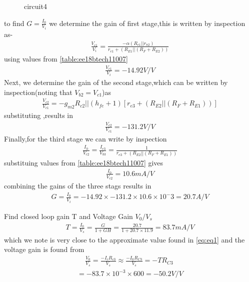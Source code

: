 \begin{enumerate}[label=\thesubsection.\arabic*.,ref=\thesubsection.\theenumi]
{\begin{figure}[!ht]
\begin{center}
		\resizebox{\columnwidth}{!}{}
	\end{center}
\caption{circuit4}
\label{fig:circuit4}
\end{figure}
to find $G=\frac{I_0}{V_i}$ we determine the gain of first stage,this is written by inspection as-
\begin{align}
    \frac{V_{c1}}{V_i}=\frac{-\alpha(R_{c1}||r_{\pi2})}{r_{e1}+(R_{E1}||(R_F+R_{E2}))}
\end{align}
using values from \ref{table:ee18btech11007}
\begin{align}
\frac{V_{c1}}{V_i}=-14.92V/V     
\end{align}
Next, we determine the gain of the second stage,which can be written by inspection(noting that $V_{b2}=V_{c1}$)as
\begin{align}
    \frac{V_{c2}}{V_{c1}}=-g_{m2}{R_{c2}||(h_{fe}+1)[r_{e3}+(R_{E2}||(R_F+R_{E1}))]}
\end{align}
substituting ,results in 
\begin{align}
    \frac{V_{c2}}{V_{c1}}=-131.2 V/V
\end{align}
Finally,for the third stage we can write by inspection
\begin{align}
    \frac{I_0}{V_{c2}}=\frac{I_{e3}}{V_{b3}}=\frac{1}{r_{e3}+(R_{E2}||(R_F+R_{E1}))}
\end{align}
substituing values from \ref{table:ee18btech11007} gives
\begin{align}
    \frac{I_0}{V_{c2}}=10.6mA/V
\end{align}
combining the gains of the three stags results in
\begin{align}
G=\frac{I_0}{V_i}=-14.92\times-131.2\times10.6\times10^-3=20.7A/V    
\end{align}
\item Find closed loop gain T and Voltage Gain $V_0/V_s$
\\ \solution
 \begin{align}
    T=\frac{I_0}{V_s}=\frac{G}{1+GH}=\frac{20.7}{1+20.7\times11.9}=83.7mA/V
\end{align}
which we note is very close to the approximate value found in \eqref{eq:eq1} and the voltage gain is found from 
\begin{align}
    \frac{V_0}{V_s}=\frac{-I_cR_{c3}}{V_s}\approx\frac{-I_0R_{C3}}{V_s}=-TR_{C3}
    \
\end{align}
\begin{align}
    =-83.7\times10^{-3}\times600=-50.2V/V
\end{align}
}
\end{enumerate}
